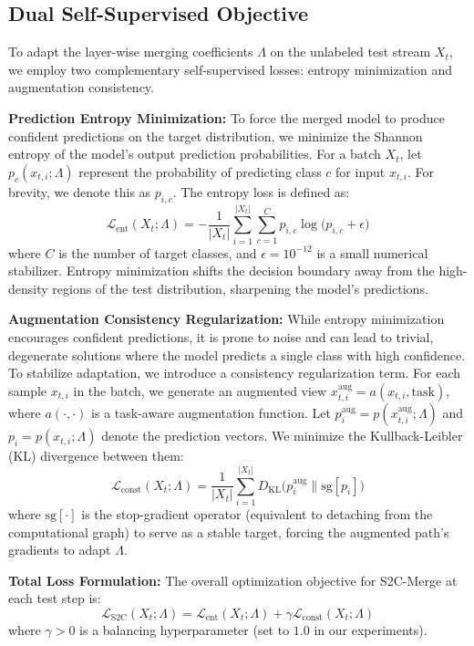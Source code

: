 \documentclass{article}
\theoremstyle{plain}
\theoremstyle{definition}
\theoremstyle{remark}
\begin{document}
\subsection{Dual Self-Supervised Objective}
To adapt the layer-wise merging coefficients $\Lambda$ on the unlabeled test stream $X_t$, we employ two complementary self-supervised losses: entropy minimization and augmentation consistency.

\textbf{Prediction Entropy Minimization:} To force the merged model to produce confident predictions on the target distribution, we minimize the Shannon entropy of the model's output prediction probabilities. For a batch $X_t$, let $p_c(x_{t,i}; \Lambda)$ represent the probability of predicting class $c$ for input $x_{t,i}$. For brevity, we denote this as $p_{i,c}$. The entropy loss is defined as:
\begin{equation}
    \mathcal{L}_{\text{ent}}(X_t; \Lambda) = - \frac{1}{|X_t|} \sum_{i=1}^{|X_t|} \sum_{c=1}^C p_{i,c} \log \big(p_{i,c} + \epsilon \big)
\end{equation}
where $C$ is the number of target classes, and $\epsilon = 10^{-12}$ is a small numerical stabilizer. Entropy minimization shifts the decision boundary away from the high-density regions of the test distribution, sharpening the model's predictions.

\textbf{Augmentation Consistency Regularization:} While entropy minimization encourages confident predictions, it is prone to noise and can lead to trivial, degenerate solutions where the model predicts a single class with high confidence. To stabilize adaptation, we introduce a consistency regularization term. For each sample $x_{t,i}$ in the batch, we generate an augmented view $x^{\text{aug}}_{t,i} = a(x_{t,i}, \text{task})$, where $a(\cdot, \cdot)$ is a task-aware augmentation function. Let $p^{\text{aug}}_{i} = p(x^{\text{aug}}_{t,i}; \Lambda)$ and $p_{i} = p(x_{t,i}; \Lambda)$ denote the prediction vectors. We minimize the Kullback-Leibler (KL) divergence between them:
\begin{equation}
    \mathcal{L}_{\text{const}}(X_t; \Lambda) = \frac{1}{|X_t|} \sum_{i=1}^{|X_t|} D_{\text{KL}}\big( p^{\text{aug}}_{i} \parallel \text{sg}[p_{i}] \big)
\end{equation}
where $\text{sg}[\cdot]$ is the stop-gradient operator (equivalent to detaching from the computational graph) to serve as a stable target, forcing the augmented path's gradients to adapt $\Lambda$.

\textbf{Total Loss Formulation:} The overall optimization objective for S2C-Merge at each test step is:
\begin{equation}
    \mathcal{L}_{\text{S2C}}(X_t; \Lambda) = \mathcal{L}_{\text{ent}}(X_t; \Lambda) + \gamma \mathcal{L}_{\text{const}}(X_t; \Lambda)
\end{equation}
where $\gamma > 0$ is a balancing hyperparameter (set to $1.0$ in our experiments).
\end{document}
